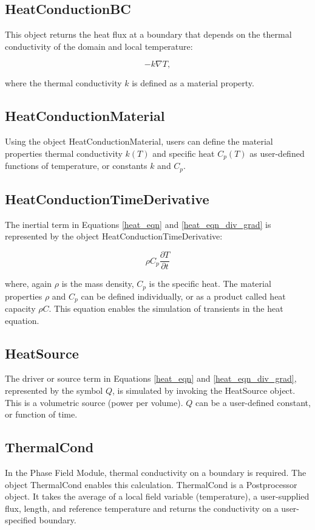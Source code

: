 \documentclass[preprint,5p]{elsarticle}
\begin{document}
\subsection{HeatConductionBC}
This object returns the heat flux at a boundary that depends on the thermal conductivity of the domain and local temperature:

\begin{equation}
- k\nabla T,
\end{equation}

where the thermal conductivity $k$ is defined as a material property.

\subsection{HeatConductionMaterial}
Using the object HeatConductionMaterial, users can define the material properties thermal conductivity $k(T)$ and specific heat $C_p(T)$ as user-defined functions of temperature, or constants $k$ and $C_p$.

\subsection{HeatConductionTimeDerivative}
The inertial term in Equations \ref{heat_eqn} and \ref{heat_eqn_div_grad} is represented by the object HeatConductionTimeDerivative:

\begin{equation}
\rho C_p \frac{\partial T}{\partial t}
\end{equation}

where, again $\rho$ is the mass density, $C_p$ is the specific heat. The material properties $\rho$ and $C_p$ can be defined individually, or as a product called heat capacity $\rho  C$. This equation enables the simulation of transients in the heat equation.

\subsection{HeatSource}
The driver or source term in Equations \ref{heat_eqn} and \ref{heat_eqn_div_grad}, represented by the symbol $Q$, is simulated by invoking the HeatSource object. This is a volumetric source (power per volume). $Q$ can be a user-defined constant, or function of time.

\subsection{ThermalCond}
In the Phase Field Module, thermal conductivity on a boundary is required. The object ThermalCond enables this calculation. ThermalCond is a Postprocessor object. It takes the average of a local field variable (temperature), a user-supplied flux, length, and reference temperature and returns the conductivity on a user-specified boundary.
\end{document}
